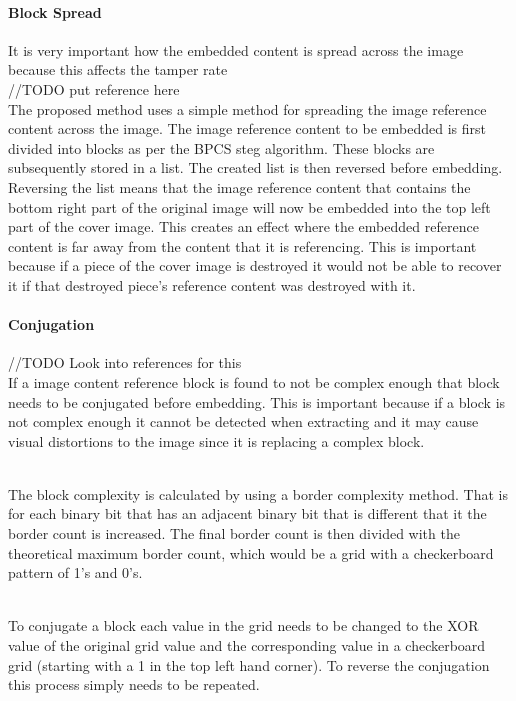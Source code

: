 \documentclass[12pt]{article}
\begin{document}
\paragraph{Block Spread}
It is very important how the embedded content is spread across the image because this affects the tamper rate
\hspace{0pt} \\
//TODO put reference here
\hspace{0pt} \\
The proposed method uses a simple method for spreading the image reference content across the image.
The image reference content to be embedded is first divided into blocks as per the BPCS steg algorithm.
These blocks are subsequently stored in a list. 
The created list is then reversed before embedding.
Reversing the list means that the image reference content that contains the bottom right part of the original image will now be embedded into the top left part of the cover image.
This creates an effect where the embedded reference content is far away from the content that it is referencing.
This is important because if a piece of the cover image is destroyed it would not be able to recover it if that destroyed piece's reference content was destroyed with it.

\paragraph{Conjugation}
//TODO Look into references for this 
\hspace{0pt} \\
If a image content reference block is found to not be complex enough that block needs to be conjugated before embedding.
This is important because if a block is not complex enough it cannot be detected when extracting and it may cause visual distortions to the image since it is replacing a complex block.

\hspace{0pt} \\
The block complexity is calculated by using a border complexity method.
That is for each binary bit that has an adjacent binary bit that is different that it the border count is increased. 
The final border count is then divided with the theoretical maximum border count, which would be a grid with a checkerboard pattern of 1's and 0's.

\hspace{0pt} \\
To conjugate a block each value in the grid needs to be changed to the XOR value of the original grid value and the corresponding value in a checkerboard grid (starting with a 1 in the top left hand corner).
To reverse the conjugation this process simply needs to be repeated.
\end{document}
